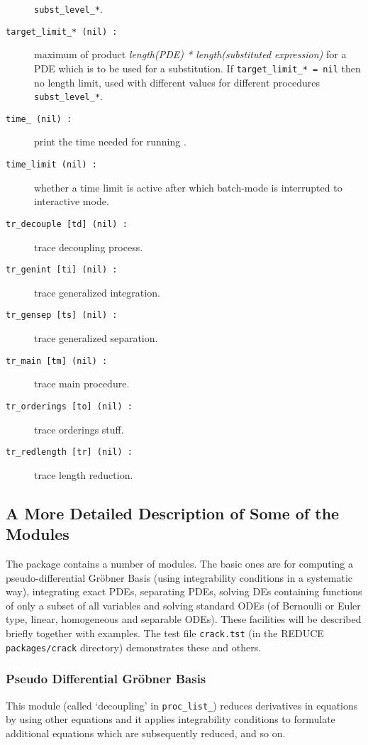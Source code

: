 \begin{description}
  \texttt{subst\_level\_*}.
\item[\texttt{target\_limit\_* (nil) :}] maximum of product
  \emph{length(PDE) * length(substituted expression)} for a PDE which
  is to be used for a substitution.  If \texttt{target\_limit\_* =
    nil} then no length limit, used with different values for
  different procedures \texttt{subst\_level\_*}.
\item[\texttt{time\_ (nil) :}] print the time needed for running
  .
\item[\texttt{time\_limit (nil) :}] whether a time limit is active
  after which batch-mode is interrupted to interactive mode.
\item[\texttt{tr\_decouple [td] (nil) :}] trace decoupling process.
\item[\texttt{tr\_genint [ti] (nil) :}] trace generalized integration.
\item[\texttt{tr\_gensep [ts] (nil) :}] trace generalized separation.
\item[\texttt{tr\_main [tm] (nil) :}] trace main procedure.
\item[\texttt{tr\_orderings [to] (nil) :}] trace orderings stuff.
\item[\texttt{tr\_redlength [tr] (nil) :}] trace length reduction.
\end{description}

\subsection{A More Detailed Description of Some of the Modules}

The package  contains a number of modules.  The basic
ones are for computing a pseudo-differential Gr\"{o}bner Basis (using
integrability conditions in a systematic way), integrating exact PDEs,
separating PDEs, solving DEs containing functions of only a subset of
all variables and solving standard ODEs (of Bernoulli or Euler type,
linear, homogeneous and separable ODEs).  These facilities will be
described briefly together with examples.  The test file
\texttt{crack.tst} (in the REDUCE \texttt{packages/crack} directory)
demonstrates these and others.

\subsubsection{Pseudo Differential Gr\"{o}bner Basis}

This module (called `decoupling' in \texttt{proc\_list\_}) reduces
derivatives in equations by using other equations and it applies
integrability conditions to formulate additional equations which are
subsequently reduced, and so on.

